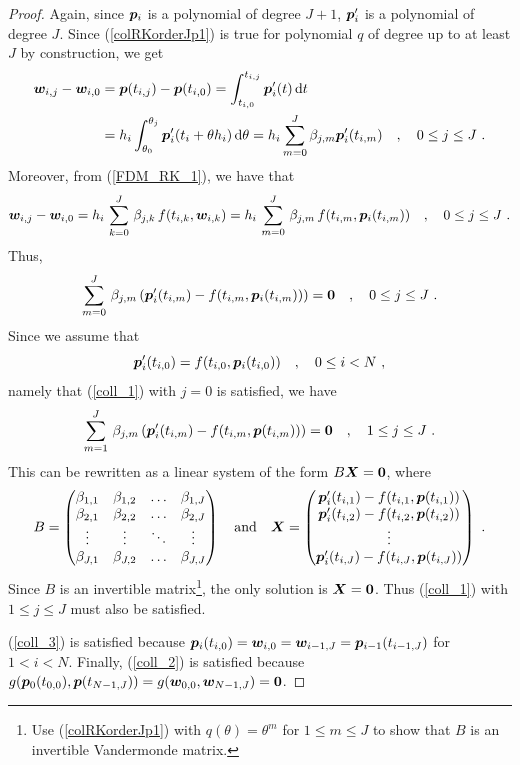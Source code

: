 \begin{proof}
Again, since $\bm{p}_i$ is a polynomial of degree $J+1$, $\bm{p}_i'$
is a polynomial of degree $J$.  Since (\ref{colRKorderJp1}) 
is true for polynomial $q$ of degree up to at least $J$ by construction,
we get
\begin{align*}
\bm{w}_{i,j} - \bm{w}_{i,0} &= \bm{p}(t_{i,j}) - \bm{p}(t_{i,0})
= \int_{t_{i,0}}^{t_{i,j}} \bm{p}_i'(t) \,\mathrm{d}t \\
&= h_i \int_{\theta_0}^{\theta_j} \bm{p}_i'(t_i+\theta h_i) \,\mathrm{d}\theta
= h_i \sum_{m=0}^J \beta_{j,m}\bm{p}_i'(t_{i,m}) \quad , \quad
0 \leq j \leq J \ .
\end{align*}
Moreover, from (\ref{FDM_RK_1}), we have that
\[
\bm{w}_{i,j}- \bm{w}_{i,0} =
h_i\,\sum_{k=0}^J\,\beta_{j,k}\,f(t_{i,k},\bm{w}_{i,k})
= h_i\,\sum_{m=0}^J\,\beta_{j,m}\,f(t_{i,m},\bm{p}_i(t_{i,m}))
\quad , \quad  0 \leq j\leq J \ .
\]
Thus,
\[
\sum_{m=0}^J\,\beta_{j,m}\left( \bm{p}_i'(t_{i,m}) -
f(t_{i,m},\bm{p}_i(t_{i,m})) \right) = \bm{0}
\quad , \quad  0 \leq j \leq J \ .
\]
Since we assume that
\[
\bm{p}_i'(t_{i,0}) = f(t_{i,0},\bm{p}_i(t_{i,0})) \quad , \quad
0 \leq i < N \ ,
\]
namely that (\ref{coll_1}) with $j=0$ is satisfied, we have
\[
\sum_{m=1}^J\,\beta_{j,m}\left( \bm{p}_i'(t_{i,m}) -
f(t_{i,m},\bm{p}(t_{i,m})) \right) = \bm{0}
\quad , \quad  1 \leq j \leq J \ .
\]
This can be rewritten as a linear system of the
form $B\bm{X}=\bm{0}$, where
\[
B = \begin{pmatrix}
\beta_{1,1} & \beta_{1,2} & \ldots & \beta_{1,J} \\
\beta_{2,1} & \beta_{2,2} & \ldots & \beta_{2,J} \\
 \vdots & \vdots & \ddots & \vdots \\
\beta_{J,1} & \beta_{J,2} & \ldots & \beta_{J,J}
\end{pmatrix}
\quad \text{and} \quad
\bm{X} = \begin{pmatrix}
  \bm{p}_i'(t_{i,1}) - f(t_{i,1},\bm{p}(t_{i,1})) \\
  \bm{p}_i'(t_{i,2}) - f(t_{i,2},\bm{p}(t_{i,2})) \\
  \vdots \\
  \bm{p}_i'(t_{i,J}) - f(t_{i,J},\bm{p}(t_{i,J}))
\end{pmatrix} \ .
\]
Since $B$ is an invertible matrix\footnote{Use (\ref{colRKorderJp1}) with
$q(\theta) = \theta^m$ for $1\leq m \leq J$ to show that $B$ is
an invertible Vandermonde matrix.}, the only solution is $\bm{X}= \bm{0}$.
Thus (\ref{coll_1}) with $1\leq j \leq J$ must also be satisfied.

(\ref{coll_3}) is satisfied because $\bm{p}_i(t_{i,0}) =
\bm{w}_{i,0} = \bm{w}_{i-1,J} = \bm{p}_{i-1}(t_{i-1,J})$ for
$1 < i < N$.  Finally, (\ref{coll_2}) is satisfied because
$g(\bm{p}_0(t_{0,0}),\bm{p}(t_{N-1,J})) =
g(\bm{w}_{0,0},\bm{w}_{N-1,J}) = \bm{0}$.
\end{proof}

